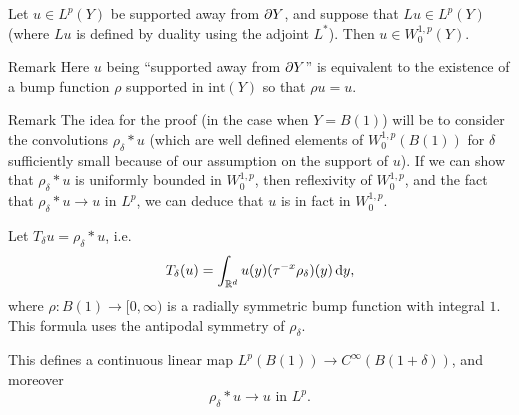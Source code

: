 \begin{thm}
  Let $u\in L^{p}(Y)$ be supported away from $\partial Y$, and suppose that
  $Lu\in L^{p}(Y)$ (where $Lu$ is defined by duality using the adjoint
  $L^{*}$). Then $u\in W^{1,p}_{0}(Y)$. 
\end{thm}
\begin{clear}{Remark}
  Here $u$ being ``supported away from $\partial Y$'' is equivalent to the existence
  of a bump function $\rho$ supported in $\text{int}(Y)$ so that $\rho
  u=u$.
\end{clear}
\begin{clear}{Remark}
  The idea for the proof (in the case when $Y=B(1)$) will be to consider the convolutions
  $\rho_{\delta}\ast u$ (which are well defined elements of
  $W^{1,p}_{0}(B(1))$ for $\delta$ sufficiently small because of our
  assumption on the support of $u$). If we can show that
  $\rho_{\delta}\ast u$ is uniformly bounded in $W^{1,p}_{0}$, then
  reflexivity of $W^{1,p}_{0}$, and the fact that $\rho_{\delta}\ast
  u\to u$ in $L^{p}$, we can deduce that $u$ is in fact in
  $W^{1,p}_{0}$.
\end{clear}
\begin{defn}
  Let $T_{\delta}u=\rho_{\delta}\ast u$, i.e.
  \begin{equation*}
    T_{\delta}(u)=\int_{\mathbb{R}^{d}} u(y)(\tau^{-x}\rho_{\delta})(y)\,\mathrm{d} y,
  \end{equation*}
  where $\rho:B(1)\to [0,\infty)$ is a radially symmetric bump
  function with integral $1$. This formula uses the antipodal symmetry of
  $\rho_{\delta}$.

  This defines a continuous linear
  map $L^{p}(B(1))\to C^{\infty}(B(1+\delta))$, and moreover
  \begin{equation*}
    \rho_{\delta}\ast u\to u\text{ in $L^{p}$}.
  \end{equation*}
\end{defn}

